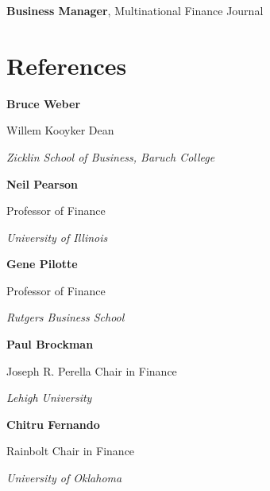 \documentclass[11pt,a4paper,]{awesome-cv}
\begin{document}
\textbf{Business Manager}, Multinational Finance Journal

\newpage

\section{References}\label{references}

\textbf{Bruce Weber}

Willem Kooyker Dean

\textit{Zicklin School of Business, Baruch College}

\textbf{Neil Pearson}

Professor of Finance

\textit{University of Illinois}

\textbf{Gene Pilotte}

Professor of Finance

\textit{Rutgers Business School}

\textbf{Paul Brockman}

Joseph R. Perella Chair in Finance

\textit{Lehigh University}

\textbf{Chitru Fernando}

Rainbolt Chair in Finance

\textit{University of Oklahoma}
\end{document}
